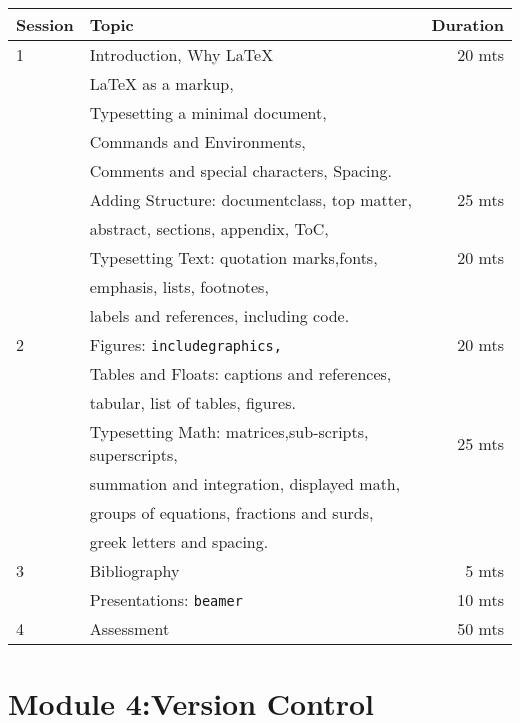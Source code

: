 \documentclass{article}
\begin{document}
\begin{tabular}{llr}
\hline
Session & Topic & Duration\\\hline
1 & Introduction, Why LaTeX                                   & 20 mts\\ 
  & LaTeX as a markup,                                        & \\ 
  & Typesetting a minimal document,                           & \\
  & Commands and Environments,                                & \\
  & Comments and special characters, Spacing.                 & \\
  & Adding Structure: documentclass, top matter,              & 25 mts\\
  & abstract, sections, appendix, ToC,                        & \\
  & Typesetting Text: quotation marks,fonts,                  & 20 mts\\
  & emphasis, lists, footnotes,                               & \\
  & labels and references, including code.                    & \\\hline

2 & Figures: \tt{includegraphics},                            & 20 mts\\
  & Tables and Floats: captions and references,               & \\
  & tabular, list of tables, figures.                         & \\
  & Typesetting Math: matrices,sub-scripts, superscripts,     & 25 mts\\
  & summation and integration, displayed math,                & \\
  & groups of equations, fractions and surds,                 & \\
  & greek letters and spacing.                                & \\\hline

3 & Bibliography                                              & ~5 mts\\
  & Presentations: \tt{beamer}                                & 10 mts\\\hline

4 & Assessment                                                & 50 mts\\\hline\hline
\end{tabular}

\section{Module 4:Version Control}
\label{VC}
\end{document}
